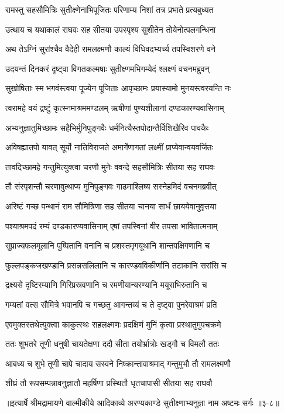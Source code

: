 
\twolineshloka
{रामस्तु सहसौमित्रिः सुतीक्ष्णेनाभिपूजितः}
{परिणाम्य निशां तत्र प्रभाते प्रत्यबुध्यत} %

\twolineshloka
{उत्थाय च यथाकालं राघवः सह सीतया}
{उपस्पृश्य सुशीतेन तोयेनोत्पलगन्धिना} %

\twolineshloka
{अथ तेऽग्निं सुरांश्चैव वैदेही रामलक्ष्मणौ}
{काल्यं विधिवदभ्यर्च्य तपस्विशरणे वने} %

\twolineshloka
{उदयन्तं दिनकरं दृष्ट्वा विगतकल्मषाः}
{सुतीक्ष्णमभिगम्येदं श्लक्ष्णं वचनमब्रुवन्} %

\twolineshloka
{सुखोषिताः स्म भगवंस्त्वया पूज्येन पूजिताः}
{आपृच्छामः प्रयास्यामो मुनयस्त्वरयन्ति नः} %

\twolineshloka
{त्वरामहे वयं द्रष्टुं कृत्स्नमाश्रममण्डलम्}
{ऋषीणां पुण्यशीलानां दण्डकारण्यवासिनाम्} %

\twolineshloka
{अभ्यनुज्ञातुमिच्छामः सहैभिर्मुनिपुङ्गवैः}
{धर्मनित्यैस्तपोदान्तैर्विशिखैरिव पावकैः} %

\twolineshloka
{अविषह्यातपो यावत् सूर्यो नातिविराजते}
{अमार्गेणागतां लक्ष्मीं प्राप्येवान्वयवर्जितः} %

\twolineshloka
{तावदिच्छामहे गन्तुमित्युक्त्वा चरणौ मुनेः}
{ववन्दे सहसौमित्रिः सीतया सह राघवः} %

\twolineshloka
{तौ संस्पृशन्तौ चरणावुत्थाप्य मुनिपुङ्गवः}
{गाढमाश्लिष्य सस्नेहमिदं वचनमब्रवीत्} %

\twolineshloka
{अरिष्टं गच्छ पन्थानं राम सौमित्रिणा सह}
{सीतया चानया सार्धं छाययेवानुवृत्तया} %

\twolineshloka
{पश्याश्रमपदं रम्यं दण्डकारण्यवासिनाम्}
{एषां तपस्विनां वीर तपसा भावितात्मनाम्} %

\twolineshloka
{सुप्राज्यफलमूलानि पुष्पितानि वनानि च}
{प्रशस्तमृगयूथानि शान्तपक्षिगणानि च} %

\twolineshloka
{फुल्लपङ्कजखण्डानि प्रसन्नसलिलानि च}
{कारण्डवविकीर्णानि तटाकानि सरांसि च} %

\twolineshloka
{द्रक्ष्यसे दृष्टिरम्याणि गिरिप्रस्रवणानि च}
{रमणीयान्यरण्यानि मयूराभिरुतानि च} %

\twolineshloka
{गम्यतां वत्स सौमित्रे भवानपि च गच्छतु}
{आगन्तव्यं च ते दृष्ट्वा पुनरेवाश्रमं प्रति} %

\twolineshloka
{एवमुक्तस्तथेत्युक्त्वा काकुत्स्थः सहलक्ष्मणः}
{प्रदक्षिणं मुनिं कृत्वा प्रस्थातुमुपचक्रमे} %

\twolineshloka
{ततः शुभतरे तूणी धनुषी चायतेक्षणा}
{ददौ सीता तयोर्भ्रात्रोः खड्गौ च विमलौ ततः} %

\twolineshloka
{आबध्य च शुभे तूणी चापे चादाय सस्वने}
{निष्क्रान्तावाश्रमाद् गन्तुमुभौ तौ रामलक्ष्मणौ} %

\twolineshloka
{शीघ्रं तौ रूपसम्पन्नावनुज्ञातौ महर्षिणा}
{प्रस्थितौ धृतचापासी सीतया सह राघवौ} %


॥इत्यार्षे श्रीमद्रामायणे वाल्मीकीये आदिकाव्ये अरण्यकाण्डे सुतीक्ष्णाभ्यनुज्ञा नाम अष्टमः सर्गः ॥३-८॥
